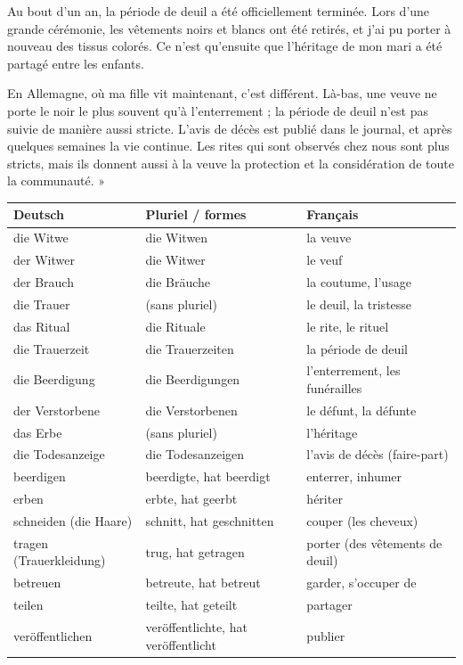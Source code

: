 \documentclass[11pt]{article}
\newcounter{popsec}
\newcounter{popsub}
\newcommand{\courssub}[1]{%
  \stepcounter{popsub}%
  \par\vspace{9pt}\noindent{\popxbold\fontsize{11.5}{13}\selectfont\color{popink}{\color{poporange}\thepopsec.\thepopsub}\hspace{6pt}#1}\par\nopagebreak\vspace{4pt}
}
\begin{document}
Au bout d'un an, la période de deuil a été officiellement terminée. Lors d'une grande cérémonie, les vêtements noirs et blancs ont été retirés, et j'ai pu porter à nouveau des tissus colorés. Ce n'est qu'ensuite que l'héritage de mon mari a été partagé entre les enfants.

En Allemagne, où ma fille vit maintenant, c'est différent. Là-bas, une veuve ne porte le noir le plus souvent qu'à l'enterrement ; la période de deuil n'est pas suivie de manière aussi stricte. L'avis de décès est publié dans le journal, et après quelques semaines la vie continue. Les rites qui sont observés chez nous sont plus stricts, mais ils donnent aussi à la veuve la protection et la considération de toute la communauté. »

\courssub{Glossaire du texte}

\begin{center}
\begin{tabularx}{\linewidth}{|l|X|X|}
\hline
\rowcolor{popblueL} \textbf{Deutsch} & \textbf{Pluriel / formes} & \textbf{Français} \\
\hline
die Witwe & die Witwen & la veuve \\
\hline
der Witwer & die Witwer & le veuf \\
\hline
der Brauch & die Bräuche & la coutume, l'usage \\
\hline
die Trauer & (sans pluriel) & le deuil, la tristesse \\
\hline
das Ritual & die Rituale & le rite, le rituel \\
\hline
die Trauerzeit & die Trauerzeiten & la période de deuil \\
\hline
die Beerdigung & die Beerdigungen & l'enterrement, les funérailles \\
\hline
der Verstorbene & die Verstorbenen & le défunt, la défunte \\
\hline
das Erbe & (sans pluriel) & l'héritage \\
\hline
die Todesanzeige & die Todesanzeigen & l'avis de décès (faire-part) \\
\hline
beerdigen & beerdigte, hat beerdigt & enterrer, inhumer \\
\hline
erben & erbte, hat geerbt & hériter \\
\hline
schneiden (die Haare) & schnitt, hat geschnitten & couper (les cheveux) \\
\hline
tragen (Trauerkleidung) & trug, hat getragen & porter (des vêtements de deuil) \\
\hline
betreuen & betreute, hat betreut & garder, s'occuper de \\
\hline
teilen & teilte, hat geteilt & partager \\
\hline
veröffentlichen & veröffentlichte, hat veröffentlicht & publier \\
\hline
\end{tabularx}
\end{center}
\end{document}
